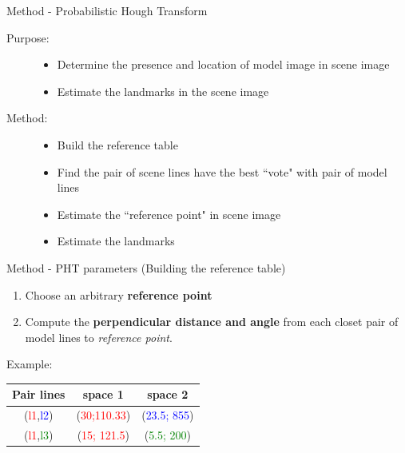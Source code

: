 \documentclass{beamer}
\begin{document}
\begin{frame}{Method - Probabilistic Hough Transform}
	\begin{description}
		\item[Purpose:]
			\begin{itemize}
				\item Determine the presence and location of model image in scene image
				\item Estimate the landmarks in the scene image
			\end{itemize}
		\item[Method:]
		\begin{itemize}
			\item Build the reference table
			\item Find the pair of scene lines have the best ``vote" with pair of model lines
			\item Estimate the ``reference point" in scene image
			\item Estimate the landmarks
		\end{itemize}
	\end{description}
\end{frame}
\begin{frame}{Method - PHT parameters (Building the reference table)}
	\begin{enumerate}
		\item Choose an arbitrary \textbf{reference point}
		\item Compute the \textbf{perpendicular distance and angle} from each closet pair of model lines to \textit{reference point}.
	\end{enumerate}
	Example:
	\begin{center}
		\begin{tabular}{|c|c|c|}
		\hline
			Pair lines & space 1 & space 2 \\ \hline
			(\textcolor{red}{l1},\textcolor{blue}{l2}) & (\textcolor{red}{30;110.33}) & (\textcolor{blue}{23.5; 855})  \\ \hline
			(\textcolor{red}{l1},\textcolor{green}{l3}) & (\textcolor{red}{15; 121.5}) & (\textcolor{green}{5.5; 200})   \\ \hline
		\end{tabular}
	\end{center}
\end{frame}
\end{document}
